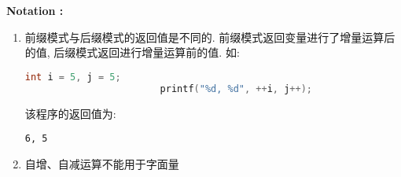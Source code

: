         \textbf{Notation :}
            \begin{enumerate}
                \item 前缀模式与后缀模式的返回值是不同的. 前缀模式返回变量进行了增量运算后的值, 后缀模式返回进行增量运算前的值. 如:
                    \begin{lstlisting}[language = {C}, gobble = 24]
                        int i = 5, j = 5;
                        printf("%d, %d", ++i, j++);
                    \end{lstlisting}
                    该程序的返回值为:
                    \begin{lstlisting}[gobble = 24]
                        6, 5
                    \end{lstlisting}
                \item 自增、自减运算不能用于字面量
            \end{enumerate}
